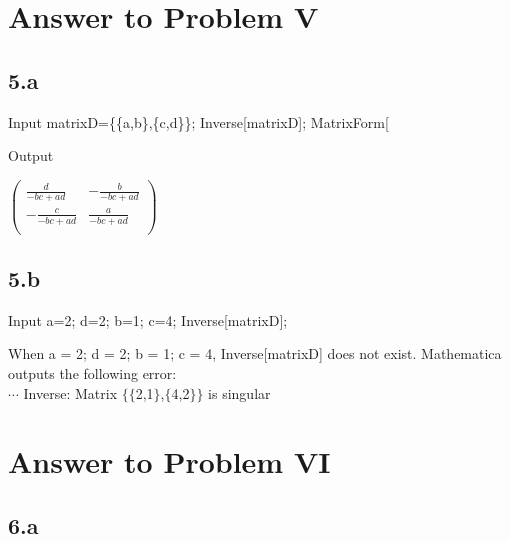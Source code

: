\documentclass[11pt,a4paper]{article}
\begin{document}
\clearpage
\section{Answer to Problem V}\label{sec:P05}

\subsection*{5.a}

\begin{mmaCell}[moredefined={matrixD}]{Input}
matrixD=\{\{a,b\},\{c,d\}\};
Inverse[matrixD];
MatrixForm[%
\end{mmaCell}

\begin{mmaCell}[form=MatrixForm]{Output}

\end{mmaCell}

\begin{doublespace}
\noindent\(\left(
\begin{array}{cc}
 \frac{d}{-b c+a d} & -\frac{b}{-b c+a d} \\
 -\frac{c}{-b c+a d} & \frac{a}{-b c+a d} \\
\end{array}
\right)\)
\end{doublespace}

\subsection*{5.b}

\begin{mmaCell}[moredefined={a, d, b, c, matrixD}]{Input}
a=2;
d=2;
b=1;
c=4;
Inverse[matrixD];
\end{mmaCell}

When { }a = 2; d = 2; b = 1; c = 4, Inverse[matrixD] does not exist. Mathematica outputs the following error:\\
$\cdots $ Inverse: Matrix $\{\{$2,1$\}$,$\{$4,2$\}\}$ is singular

\clearpage
\section{Answer to Problem VI}\label{sec:P06}

\subsection*{6.a}
\end{document}
